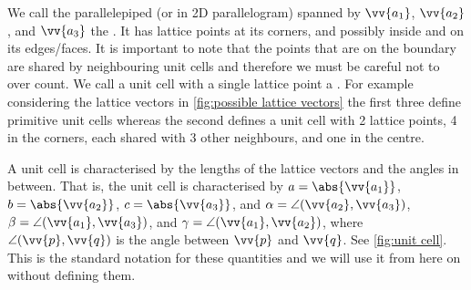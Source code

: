 \documentclass[fleqn]{NotesClass}
\begin{document}
    We call the parallelepiped (or in 2D parallelogram) spanned by \(\vv{a_1}\), \(\vv{a_2}\), and \(\vv{a_3}\) the .
    It has lattice points at its corners, and possibly inside and on its edges/faces.
    It is important to note that the points that are on the boundary are shared by neighbouring unit cells and therefore we must be careful not to over count.
    We call a unit cell with a single lattice point a .
    For example considering the lattice vectors in \cref{fig:possible lattice vectors} the first three define primitive unit cells whereas the second defines a unit cell with 2 lattice points, 4 in the corners, each shared with 3 other neighbours, and one in the centre.
    
    A unit cell is characterised by the lengths of the lattice vectors and the angles in between.
    That is, the unit cell is characterised by \(a = \abs{\vv{a_1}}\), \(b = \abs{\vv{a_2}}\), \(c = \abs{\vv{a_3}}\), and \(\alpha = \angle(\vv{a_2}, \vv{a_3})\), \(\beta = \angle(\vv{a_1},\vv{a_3})\), and \(\gamma = \angle(\vv{a_1},\vv{a_2})\), where \(\angle(\vv{p}, \vv{q})\) is the angle between \(\vv{p}\) and \(\vv{q}\).
    See \cref{fig:unit cell}.
    This is the standard notation for these quantities and we will use it from here on without defining them.
    
\end{document}
